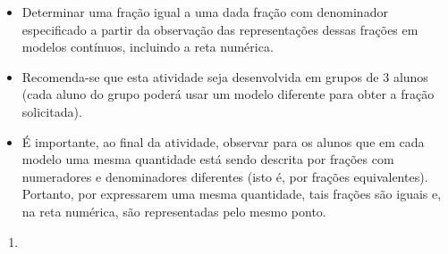 \begin{atividade}\label{chap4-ativ8}
\objetivos
\begin{itemize} %
    \item       Determinar uma fração igual a uma dada fração com denominador
especificado a partir da observação das representações dessas frações em
modelos contínuos, incluindo a reta numérica.
\end{itemize} %

\discussoes
\begin{itemize} %
    \item       Recomenda-se que esta atividade seja desenvolvida em grupos de 3
alunos (cada aluno do grupo poderá usar um modelo diferente para obter a fração
solicitada).
    \item      É importante, ao final da atividade, observar para os alunos que em cada modelo uma mesma quantidade está sendo descrita por frações com numeradores e denominadores diferentes (isto é, por frações equivalentes). Portanto, por expressarem uma mesma quantidade, tais frações são iguais e, na reta numérica, são representadas pelo mesmo ponto.
\end{itemize} %

\solucao
\begin{enumerate}
\item {}
{
{
}}
\end{enumerate}
\end{atividade}
